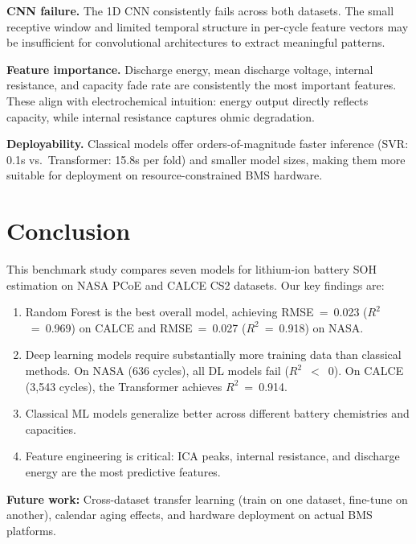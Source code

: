 \documentclass[11pt,a4paper]{article}
\begin{document}
\textbf{CNN failure.} The 1D CNN consistently fails across both datasets. The small receptive window and limited temporal structure in per-cycle feature vectors may be insufficient for convolutional architectures to extract meaningful patterns.

\textbf{Feature importance.} Discharge energy, mean discharge voltage, internal resistance, and capacity fade rate are consistently the most important features. These align with electrochemical intuition: energy output directly reflects capacity, while internal resistance captures ohmic degradation.

\textbf{Deployability.} Classical models offer orders-of-magnitude faster inference (SVR: 0.1s vs.\ Transformer: 15.8s per fold) and smaller model sizes, making them more suitable for deployment on resource-constrained BMS hardware.

\section{Conclusion}
\label{sec:conclusion}

This benchmark study compares seven models for lithium-ion battery SOH estimation on NASA PCoE and CALCE CS2 datasets. Our key findings are:

\begin{enumerate}[nosep]
    \item Random Forest is the best overall model, achieving RMSE~=~0.023 ($R^2$~=~0.969) on CALCE and RMSE~=~0.027 ($R^2$~=~0.918) on NASA.
    \item Deep learning models require substantially more training data than classical methods. On NASA (636 cycles), all DL models fail ($R^2$~$<$~0). On CALCE (3,543 cycles), the Transformer achieves $R^2$~=~0.914.
    \item Classical ML models generalize better across different battery chemistries and capacities.
    \item Feature engineering is critical: ICA peaks, internal resistance, and discharge energy are the most predictive features.
\end{enumerate}

\textbf{Future work:} Cross-dataset transfer learning (train on one dataset, fine-tune on another), calendar aging effects, and hardware deployment on actual BMS platforms.
\end{document}
